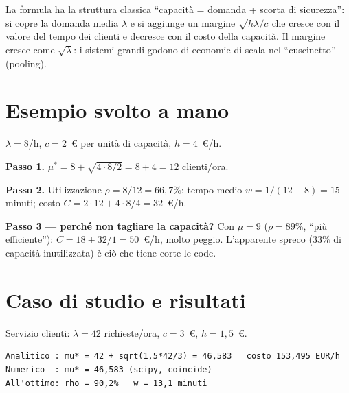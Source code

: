 \begin{spiegazione}
La formula ha la struttura classica ``capacità = domanda + scorta di sicurezza'':
si copre la domanda media $\lambda$ e si aggiunge un margine
$\sqrt{h\lambda/c}$ che cresce con il valore del tempo dei clienti e decresce con il
costo della capacità. Il margine cresce come $\sqrt{\lambda}$: i sistemi grandi godono
di economie di scala nel ``cuscinetto'' (pooling).
\end{spiegazione}

\section{Esempio svolto a mano}

\begin{esempio}
$\lambda = 8$/h, $c = 2$~\euro{} per unità di capacità, $h = 4$~\euro/h.

\textbf{Passo 1.} $\mu^* = 8 + \sqrt{4 \cdot 8 / 2} = 8 + 4 = 12$ clienti/ora.

\textbf{Passo 2.} Utilizzazione $\rho = 8/12 = 66{,}7\%$; tempo medio
$w = 1/(12-8) = 15$ minuti; costo $C = 2 \cdot 12 + 4 \cdot 8/4 = 32$~\euro/h.

\textbf{Passo 3 — perché non tagliare la capacità?} Con $\mu = 9$
($\rho = 89\%$, ``più efficiente''): $C = 18 + 32/1 = 50$~\euro/h, molto peggio.
L'apparente spreco ($33\%$ di capacità inutilizzata) è ciò che tiene corte le code.
\end{esempio}

\section{Caso di studio e risultati}

Servizio clienti: $\lambda = 42$ richieste/ora, $c = 3$~\euro, $h = 1{,}5$~\euro.

\begin{lstlisting}[style=output]
Analitico : mu* = 42 + sqrt(1,5*42/3) = 46,583   costo 153,495 EUR/h
Numerico  : mu* = 46,583 (scipy, coincide)
All'ottimo: rho = 90,2%   w = 13,1 minuti
\end{lstlisting}

